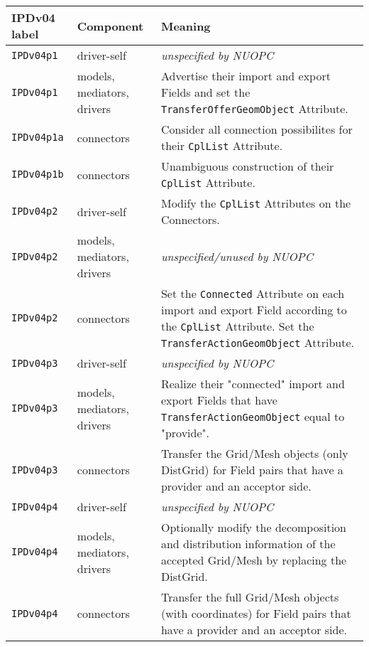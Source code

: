 \vspace*{3ex}
\begin{longtable}[h]{|p{35mm}|p{4cm}|p{6cm}|}
     \hline\hline
     {\bf IPDv04 label} & {\bf Component} & {\bf Meaning}\\
     \hline\hline
     {\tt IPDv04p1}   & driver-self                 & {\em unspecified by NUOPC}\\ \hline
     {\tt IPDv04p1}   & models, mediators, drivers  & Advertise their import and export Fields and set the {\tt TransferOfferGeomObject} Attribute.\\ \hline
     {\tt IPDv04p1a}  & connectors                  & Consider all connection possibilites for their {\tt CplList} Attribute.\\ \hline
     {\tt IPDv04p1b}  & connectors                  & Unambiguous construction of their {\tt CplList} Attribute.\\ \hline
     {\tt IPDv04p2}   & driver-self                 & Modify the {\tt CplList} Attributes on the Connectors.\\ \hline
     {\tt IPDv04p2}   & models, mediators, drivers  & {\em unspecified/unused by NUOPC}\\ \hline
     {\tt IPDv04p2}   & connectors                  & Set the {\tt Connected} Attribute on each import and export Field according to the {\tt CplList} Attribute. Set the {\tt TransferActionGeomObject} Attribute.\\ \hline
     {\tt IPDv04p3}   & driver-self                 & {\em unspecified by NUOPC}\\ \hline
     {\tt IPDv04p3}   & models, mediators, drivers  & Realize their "connected" import and export Fields that have {\tt TransferActionGeomObject} equal to "provide".\\ \hline
     {\tt IPDv04p3}   & connectors                  & Transfer the Grid/Mesh objects (only DistGrid) for Field pairs that have a provider and an acceptor side.\\ \hline
     {\tt IPDv04p4}   & driver-self                 & {\em unspecified by NUOPC}\\ \hline
     {\tt IPDv04p4}   & models, mediators, drivers  & Optionally modify the decomposition and distribution information of the accepted Grid/Mesh by replacing the DistGrid.\\ \hline
     {\tt IPDv04p4}   & connectors                  & Transfer the full Grid/Mesh objects (with coordinates) for Field pairs that have a provider and an acceptor side.\\ \hline

\end{longtable}
